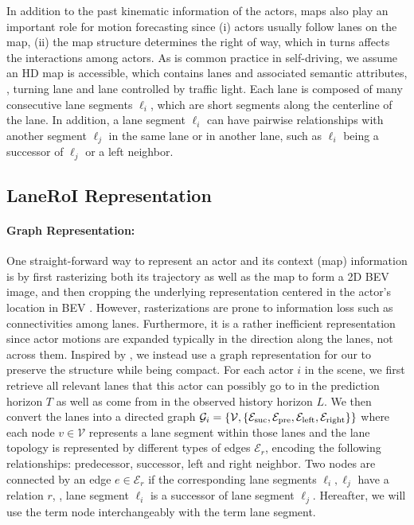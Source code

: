 In addition to the past kinematic information of the actors, maps also play an important role 
for motion forecasting since (i) actors usually follow lanes on the map, 
(ii) the map structure determines the right of way, which in turns affects the interactions among actors.
As is common practice in self-driving, we assume an HD map is accessible, 
which contains lanes and associated semantic attributes, \eg,
turning lane and lane controlled by traffic light.  
Each lane is composed of
many consecutive lane segments $\ell_i$, which are short segments
along the centerline of the lane.
In addition, a lane segment $\ell_i$ can have pairwise relationships with
another segment $\ell_j$ in the same lane or in another lane, 
such as $\ell_i$ being a successor of $\ell_j$ or a left neighbor.

\subsection{LaneRoI Representation}
\label{sec:laneroi}


\paragraph{Graph Representation:}
One straight-forward way to represent an actor and its context (map) information
is by first rasterizing both its trajectory as well as the map to form a 2D BEV image, and then cropping the underlying representation centered in the actor's location in BEV \cite{dsd, mfp, matf, spagnn}.
However, rasterizations are prone to information loss such as 
connectivities among lanes. 
Furthermore, it is a rather inefficient representation
since actor motions are expanded typically in the direction along the lanes, not across them. 
Inspired by \cite{lgn}, we instead use a graph representation for our \ROI to
preserve the structure while being compact. For each actor $i$ in the scene, we first
retrieve all relevant lanes that this actor can possibly go to in the prediction horizon
$T$ as well as come from in the observed history horizon $L$. We then convert the
lanes into a directed graph $\mathcal{G}_i =
\{\mathcal{V}, \{ \mathcal{E}_\text{suc}, \mathcal{E}_\text{pre},
    \mathcal{E}_\text{left}, \mathcal{E}_\text{right} \}\}$
where each node $v \in \mathcal{V}$ represents a lane segment within those lanes 
and the lane topology is represented by different types of edges $\mathcal{E}_r$,
encoding the following relationships: predecessor, successor, left
and right neighbor.  
Two nodes are connected by an edge $e \in \mathcal{E}_r$ if the corresponding lane segments $\ell_i,
\ell_j$ have a relation $r$, \eg, lane segment $\ell_i$ is a
successor of lane segment $\ell_j$.
Hereafter, we will use the term node interchangeably with the term lane segment. 











